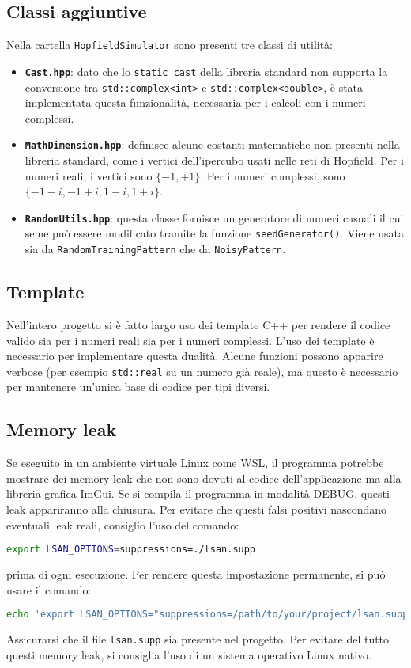 \documentclass{article}
\begin{document}
\subsection{Classi aggiuntive}
Nella cartella \texttt{HopfieldSimulator} sono presenti tre  classi di utilità:
\begin{itemize}
    \item \textbf{\texttt{Cast.hpp}}: dato che lo \texttt{static\_cast} della libreria standard non supporta la conversione tra \texttt{std::complex<int>} e \texttt{std::complex<double>}, è stata implementata questa funzionalità, necessaria per i calcoli con i numeri complessi.  
    \item \textbf{\texttt{MathDimension.hpp}}: definisce alcune costanti matematiche non presenti nella libreria standard, come i vertici dell'ipercubo usati nelle reti di Hopfield. Per i numeri reali, i vertici sono $\{-1, +1\}$. Per i numeri complessi, sono $\{-1-i, -1+i, 1-i, 1+i\}$.
    \item \textbf{\texttt{RandomUtils.hpp}}: questa classe fornisce un generatore di numeri casuali il cui seme può essere modificato tramite la funzione \texttt{seedGenerator()}. Viene usata sia da \texttt{RandomTrainingPattern} che da \texttt{NoisyPattern}.
\end{itemize}
\subsection{Template}
Nell'intero progetto si è fatto largo uso dei template C++ per rendere il codice valido sia per i numeri reali sia per i numeri complessi. L'uso dei template è necessario per implementare questa dualità. Alcune funzioni possono apparire verbose (per esempio \texttt{std::real} su un numero già reale), ma questo è necessario per mantenere un'unica base di codice per tipi diversi.
\subsection{Memory leak}
Se eseguito in un ambiente virtuale Linux come WSL, il programma potrebbe mostrare dei memory leak che non sono dovuti al codice dell'applicazione ma alla libreria grafica ImGui. Se si compila il programma in modalità DEBUG, questi leak appariranno alla chiusura. Per evitare che questi falsi positivi nascondano eventuali leak reali, consiglio l'uso del comando:
\begin{lstlisting}[language=bash]
export LSAN_OPTIONS=suppressions=./lsan.supp
\end{lstlisting}
prima di ogni esecuzione. Per rendere questa impostazione permanente, si può usare il comando:
\begin{lstlisting}[language=bash]
echo 'export LSAN_OPTIONS="suppressions=/path/to/your/project/lsan.supp"' >> ~/.bashrc
\end{lstlisting}
Assicurarsi che il file \texttt{lsan.supp} sia presente nel progetto. Per evitare del tutto questi memory leak, si consiglia l'uso di un sistema operativo Linux nativo.
\end{document}
